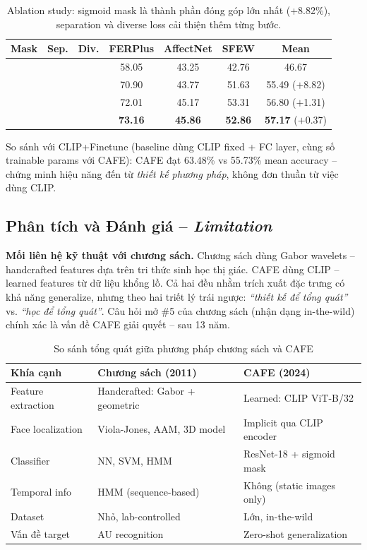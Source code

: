 \documentclass[12pt,a4paper]{article}
\newcommand{\cmark}{\ding{51}}
\let\oldtextbf\textbf
\renewcommand{\textbf}[1]{\oldtextbf{\textcolor{hcmublue}{#1}}}
\begin{document}
\begin{table}[H]
\centering
\begin{tabular}{|c|c|c|c|c|c|c|}
\hline
\textbf{Mask} & \textbf{Sep.} & \textbf{Div.} & \textbf{FERPlus} & \textbf{AffectNet} & \textbf{SFEW} & \textbf{Mean} \\ \hline
  &   &   & 58.05 & 43.25 & 42.76 & 46.67 \\
\cmark &   &   & 70.90 & 43.77 & 51.63 & 55.49 \quad ($+$8.82) \\
\cmark & \cmark &   & 72.01 & 45.17 & 53.31 & 56.80 \quad ($+$1.31) \\
\cmark & \cmark & \cmark & \textbf{73.16} & \textbf{45.86} & \textbf{52.86} & \textbf{57.17} \quad ($+$0.37) \\ \hline
\end{tabular}
\caption{Ablation study: sigmoid mask là thành phần đóng góp lớn nhất (+8.82\%), separation và diverse loss cải thiện thêm từng bước.}
\label{tab:ablation}
\end{table}

So sánh với CLIP+Finetune (baseline dùng CLIP fixed + FC layer, cùng số trainable params với CAFE): CAFE đạt 63.48\% vs 55.73\% mean accuracy -- chứng minh hiệu năng đến từ \textit{thiết kế phương pháp}, không đơn thuần từ việc dùng CLIP.

\subsection{Phân tích và Đánh giá -- \textit{Limitation}}

\textbf{Mối liên hệ kỹ thuật với chương sách.} Chương sách dùng Gabor wavelets -- handcrafted features dựa trên tri thức sinh học thị giác. CAFE dùng CLIP -- learned features từ dữ liệu khổng lồ. Cả hai đều nhằm trích xuất đặc trưng có khả năng generalize, nhưng theo hai triết lý trái ngược: \textit{``thiết kế để tổng quát''} vs. \textit{``học để tổng quát''}. Câu hỏi mở \#5 của chương sách (nhận dạng in-the-wild) chính xác là vấn đề CAFE giải quyết -- sau 13 năm.

\begin{table}[H]
\centering
\small
\begin{tabular}{|l|p{5cm}|p{5cm}|}
\hline
\textbf{Khía cạnh} & \textbf{Chương sách (2011)} & \textbf{CAFE (2024)} \\ \hline
Feature extraction & Handcrafted: Gabor + geometric & Learned: CLIP ViT-B/32 \\ \hline
Face localization & Viola-Jones, AAM, 3D model & Implicit qua CLIP encoder \\ \hline
Classifier & NN, SVM, HMM & ResNet-18 + sigmoid mask \\ \hline
Temporal info & HMM (sequence-based) & Không (static images only) \\ \hline
Dataset & Nhỏ, lab-controlled & Lớn, in-the-wild \\ \hline
Vấn đề target & AU recognition & Zero-shot generalization \\ \hline
\end{tabular}
\caption{So sánh tổng quát giữa phương pháp chương sách và CAFE}
\label{tab:comparison}
\end{table}
\end{document}

